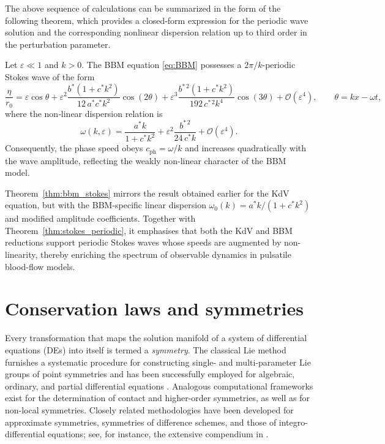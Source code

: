 \documentclass[alpha-refs, 12pt]{wiley-article}
\renewcommand{\O}{\mathcal{O}}
\newcommand{\eps}{\varepsilon}
\begin{document}
The above sequence of calculations can be summarized in the form of the following theorem, which provides a closed-form expression for the periodic wave solution and the corresponding nonlinear dispersion relation up to third order in the perturbation parameter.
\begin{theorem}\label{thm:bbm_stokes}
Let $\eps\ll1$ and $k>0$. The BBM equation \eqref{eq:BBM} possesses a $2\pi/k$-periodic Stokes wave of the form
\begin{equation}\label{eq:bbm_eta_series}
  \frac{\eta}{r_{0}}
  =\eps\cos\theta
   +\eps^{2}
      \frac{b^{\ast}(1+c^{\ast}k^{2})}{12\,a^{\ast}c^{\ast}k^{2}}
      \cos(2\theta)
   +\eps^{3}
      \frac{b^{\ast\,2}(1+c^{\ast}k^{2})}{192\,c^{\ast\,2}k^{4}}
      \cos(3\theta)
   +\O(\eps^{4}), \qquad \theta=kx-\omega t,
  \end{equation}
where the non‐linear dispersion relation is
\begin{equation}\label{eq:bbm_dispersion}
  \omega(k,\eps)
  =\frac{a^{\ast}k}{1+c^{\ast}k^{2}}
   +\eps^{2}\frac{b^{\ast\,2}}{24\,c^{\ast}k}
   +\O(\eps^{4}).
\end{equation}
Consequently, the phase speed obeys
\(
  c_{\mathrm{ph}}=\omega/k
\)
and increases quadratically with the wave amplitude, reflecting the weakly non-linear character of the BBM model.
\end{theorem}

Theorem~\ref{thm:bbm_stokes} mirrors the result obtained earlier for the KdV equation, but with the BBM-specific linear dispersion
\(
  \omega_{0}(k)=a^{\ast}k/(1+c^{\ast}k^{2})
\)
and modified amplitude coefficients. Together with Theorem~\ref{thm:stokes_periodic}, it emphasises that both the KdV and BBM reductions support periodic Stokes waves whose speeds are augmented by non-linearity, thereby enriching the spectrum of observable dynamics in pulsatile blood-flow models.

\section{Conservation laws and symmetries}
\label{sec:cons_sym}

Every transformation that maps the solution manifold of a system of differential equations (DEs) into itself is termed a \emph{symmetry}. The classical Lie method furnishes a systematic procedure for constructing single- and multi-parameter Lie groups of point symmetries and has been successfully employed for algebraic, ordinary, and partial differential equations \cite{Cheviakov2007}. Analogous computational frameworks exist for the determination of contact and higher-order symmetries, as well as for non-local symmetries. Closely related methodologies have been developed for approximate symmetries, symmetries of difference schemes, and those of integro-differential equations; see, for instance, the extensive compendium in \cite{Ibragimov1995}.
\end{document}
